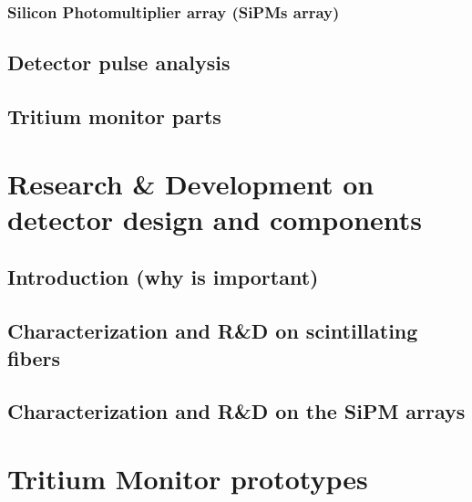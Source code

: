\documentclass[12pt,a4paper]{book}
\begin{document}
			\subsection{Silicon Photomultiplier array (SiPMs array)}%
			\label{subsec:SiPM}
			\newpage
		
	\section{Detector pulse analysis}%
	\label{sec:PulseAnalysis}
	\newpage
	
	\section{Tritium monitor parts}%
	\label{sec:TritiumMonitorParts}	
	\newpage
	
\chapter[Research \& Development]{Research \& Development on detector design and components}\label{chap:ResearchandDevelopment}
	\section{Introduction (why is important)}
	
	\section{Characterization and R\&D on scintillating fibers}
		\newpage
		
	\section{Characterization and R\&D on the SiPM arrays}
			\newpage

\chapter{Tritium Monitor prototypes}\label{chap:Prototypes}		
\end{document}
